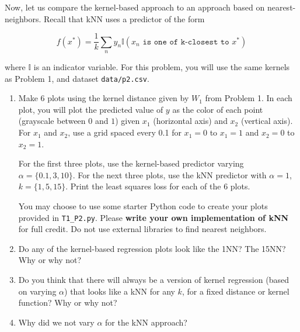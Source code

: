 \documentclass[submit]{harvardml}
\begin{document}
\begin{problem}

Now, let us compare the kernel-based approach to an approach based on
nearest-neighbors.  Recall that kNN uses a predictor of the form

  \begin{equation*}
    f(x^*) = \frac{1}{k} \sum_n y_n \mathbb{I}(x_n \texttt{ is one of k-closest to } x^*)
  \end{equation*}

 where $\mathbb{I}$ is an indicator variable. For this problem, you will use the same kernels as Problem 1, and dataset \verb|data/p2.csv|.

\begin{enumerate}

\item Make 6 plots using the kernel distance given by $W_1$ from Problem 1.  In each plot,
  you will plot the predicted value of $y$ as the color of each point (grayscale between $0$ and $1$) given $x_1$
  (horizontal axis) and $x_2$ (vertical axis).  For $x_1$ and $x_2$,
  use a grid spaced every 0.1 for $x_1=0$ to $x_1=1$ and $x_2=0$ to
  $x_2=1$.  
  
  For the first three plots, use the kernel-based predictor
  varying $\alpha = \{0.1,3,10\}$.  For the next three plots, use
  the kNN predictor with $\alpha = 1$, $k=\{1,5,15\}$.  Print the least squares loss for each of the 6 plots.
  
  You may choose to use some starter Python code to create your plots provided in \verb|T1_P2.py|.  Please \textbf{write your own implementation of kNN} for full credit.  Do not use external libraries to find nearest neighbors.
  
\item Do any of the kernel-based regression plots look like the 1NN?
  The 15NN?  Why or why not?

\item Do you think that there will always be a version of kernel
  regression (based on varying $\alpha$) that looks like a kNN for any
  $k$, for a fixed distance or kernel function?  Why or why not?
  
\item Why did we not vary $\alpha$ for the kNN approach?    

\end{enumerate}

\end{problem}
\end{document}
